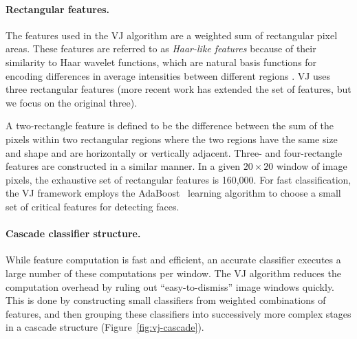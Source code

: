 \paragraph{Rectangular features.} The features used in the VJ algorithm
are a weighted sum of rectangular pixel areas. These features are referred to
as \textit{Haar-like features} because of their similarity to Haar wavelet
functions, which are natural basis functions for encoding differences in average intensities
between different regions \cite{haar_basis}.
VJ uses three rectangular features (more
recent work has extended the set of features, but we focus on the original three).

A two-rectangle feature is defined to be the difference between the sum of the
pixels within two rectangular regions where the two regions have the same size
and shape and are horizontally or vertically adjacent. Three- and four-rectangle
features are constructed in a similar manner. In a given $20\times 20$ window of image
pixels, the exhaustive set of rectangular features is 160,000. For fast
classification, the VJ framework employs the AdaBoost~\cite{adaboost} learning algorithm to choose a
small set of critical features for detecting faces.

\paragraph{Cascade classifier structure.} While feature computation is fast and efficient, an accurate classifier executes a large number of these computations per window. The VJ algorithm reduces the  computation overhead by ruling out ``easy-to-dismiss'' image windows quickly. This is done by constructing small classifiers from weighted combinations of features, and then grouping these classifiers into successively more complex stages in a cascade structure (Figure~\ref{fig:vj-cascade}).

